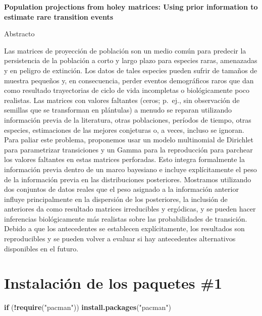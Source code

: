 \documentclass[
]{book}
\newenvironment{Shaded}{\begin{snugshade}}{\end{snugshade}}
\newcommand{\ControlFlowTok}[1]{\textcolor[rgb]{0.13,0.29,0.53}{\textbf{#1}}}
\newcommand{\FunctionTok}[1]{\textcolor[rgb]{0.13,0.29,0.53}{\textbf{#1}}}
\newcommand{\NormalTok}[1]{#1}
\newcommand{\SpecialCharTok}[1]{\textcolor[rgb]{0.81,0.36,0.00}{\textbf{#1}}}
\newcommand{\StringTok}[1]{\textcolor[rgb]{0.31,0.60,0.02}{#1}}
\theoremstyle{definition}
\theoremstyle{definition}
\theoremstyle{definition}
\theoremstyle{definition}
\theoremstyle{remark}
\begin{document}
\textbf{Population projections from holey matrices: Using prior information to estimate rare transition events}

Abstracto

Las matrices de proyección de población son un medio común para predecir la persistencia de la población a corto y largo plazo para especies raras, amenazadas y en peligro de extinción. Los datos de tales especies pueden sufrir de tamaños de muestra pequeños y, en consecuencia, perder eventos demográficos raros que dan como resultado trayectorias de ciclo de vida incompletas o biológicamente poco realistas. Las matrices con valores faltantes (ceros; p.~ej., sin observación de semillas que se transforman en plántulas) a menudo se reparan utilizando información previa de la literatura, otras poblaciones, períodos de tiempo, otras especies, estimaciones de las mejores conjeturas o, a veces, incluso se ignoran. Para paliar este problema, proponemos usar un modelo multinomial de Dirichlet para parametrizar transiciones y un Gamma para la reproducción para parchear los valores faltantes en estas matrices perforadas. Esto integra formalmente la información previa dentro de un marco bayesiano e incluye explícitamente el peso de la información previa en las distribuciones posteriores. Mostramos utilizando dos conjuntos de datos reales que el peso asignado a la información anterior influye principalmente en la dispersión de los posteriores, la inclusión de anteriores da como resultado matrices irreducibles y ergódicas, y se pueden hacer inferencias biológicamente más realistas sobre las probabilidades de transición. Debido a que los antecedentes se establecen explícitamente, los resultados son reproducibles y se pueden volver a evaluar si hay antecedentes alternativos disponibles en el futuro.

\hypertarget{instalaciuxf3n-de-los-paquetes-1}{%
\section{Instalación de los paquetes \#1}\label{instalaciuxf3n-de-los-paquetes-1}}

\begin{Shaded}
\begin{Highlighting}[]
\ControlFlowTok{if}\NormalTok{ (}\SpecialCharTok{!}\FunctionTok{require}\NormalTok{(}\StringTok{"pacman"}\NormalTok{)) }\FunctionTok{install.packages}\NormalTok{(}\StringTok{"pacman"}\NormalTok{)}
\end{Highlighting}
\end{Shaded}
\end{document}
